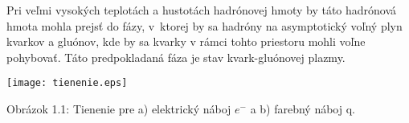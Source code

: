 Pri veľmi vysokých teplotách a hustotách hadrónovej hmoty
by táto hadrónová hmota mohla prejsť do fázy, v~ktorej by
sa hadróny  na asymptotický voľný plyn kvarkov a
gluónov, kde by sa kvarky v rámci tohto priestoru mohli voľne  pohybovať.
Táto predpokladaná fáza je stav kvark-gluónovej plazmy.

\newpage

\begin{center}
  \texttt{[image: tienenie.eps]}
\end{center}

\begin{center}
  Obrázok 1.1: Tienenie pre a) elektrický náboj $e^{-}$ a b) farebný
  náboj q.
\end{center}
